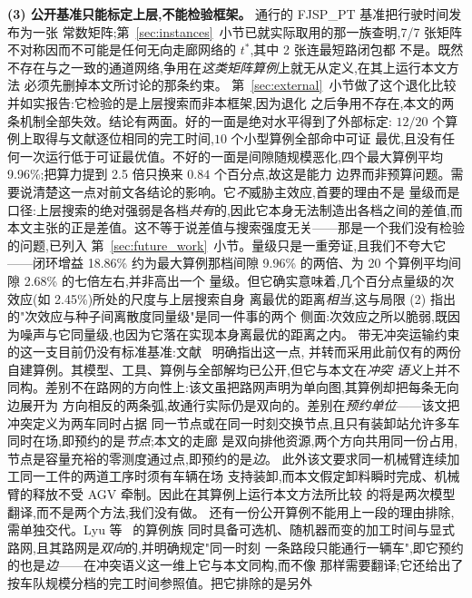 \documentclass[manuscript,screen,review]{acmart}
\newcommand{\GainLoopRule}{18.86\%}      %
\newcommand{\GainProbeLoop}{2.45\%}      %
\newcommand{\PubNInst}{20}
\newcommand{\PubNMatch}{12}               %
\newcommand{\PubGapMean}{2.68\%}          %
\newcommand{\PubGapBig}{9.96\%}           %
\newcommand{\PubBudgetRatio}{2.5}
\newcommand{\PubBudgetGainPP}{0.84}       %
\newcommand{\PubNLayout}{7}
\newcommand{\PubNLayoutAsym}{7}           %
\newcommand{\PubNLayoutBad}{2}            %
\begin{document}
\textbf{(3) 公开基准只能标定上层,不能检验框架。} 通行的 FJSP\_PT 基准把行驶时间发布为一张
常数矩阵;第~\ref{sec:instances}~小节已就实际取用的那一族查明,\PubNLayoutAsym{}/\PubNLayout{}
张矩阵不对称因而不可能是任何无向走廊网络的 $t^{*}$,其中 \PubNLayoutBad{} 张连最短路闭包都
不是。既然不存在与之一致的通道网络,争用在\emph{这类矩阵算例}上就无从定义,在其上运行本文方法
必须先删掉本文所讨论的那条约束。
第~\ref{sec:external}~小节做了这个退化比较并如实报告:它检验的是上层搜索而非本框架,因为退化
之后争用不存在,本文的两条机制全部失效。结论有两面。好的一面是绝对水平得到了外部标定:
$\PubNMatch{}/\PubNInst{}$ 个算例上取得与文献逐位相同的完工时间,$10$ 个小型算例全部命中可证
最优,且没有任何一次运行低于可证最优值。不好的一面是间隙随规模恶化,四个最大算例平均
\PubGapBig{};把算力提到 \PubBudgetRatio{} 倍只换来 $\PubBudgetGainPP$ 个百分点,故这是能力
边界而非预算问题。需要说清楚这一点对前文各结论的影响。它\emph{不}威胁主效应,首要的理由不是
量级而是口径:上层搜索的绝对强弱是各档\emph{共有}的,因此它本身无法制造出各档之间的差值,而
本文主张的正是差值。这不等于说差值与搜索强度无关——那是一个我们没有检验的问题,已列入
第~\ref{sec:future_work}~小节。量级只是一重旁证,且我们不夸大它——闭环增益 \GainLoopRule{}
约为最大算例那档间隙
\PubGapBig{} 的两倍、为 \PubNInst{} 个算例平均间隙 \PubGapMean{} 的七倍左右,并非高出一个
量级。但它确实意味着,几个百分点量级的次效应(如 \GainProbeLoop{})所处的尺度与上层搜索自身
离最优的距离\emph{相当},这与局限 (2) 指出的"次效应与种子间离散度同量级"是同一件事的两个
侧面:次效应之所以脆弱,既因为噪声与它同量级,也因为它落在实现本身离最优的距离之内。
带无冲突运输约束的这一支目前仍没有标准基准:文献~\cite{vanos2026exact} 明确指出这一点,
并转而采用此前仅有的两份自建算例。其模型、工具、算例与全部解均已公开,但它与本文在\emph{冲突
语义}上并不同构。差别不在路网的方向性上:该文虽把路网声明为单向图,其算例却把每条无向边展开为
方向相反的两条弧,故通行实际仍是双向的。差别在\emph{预约单位}——该文把冲突定义为两车同时占据
同一节点或在同一时刻交换节点,且只有装卸站允许多车同时在场,即预约的是\emph{节点};本文的走廊
是双向排他资源,两个方向共用同一份占用,节点是容量充裕的零测度通过点,即预约的是\emph{边}。
此外该文要求同一机械臂连续加工同一工件的两道工序时须有车辆在场
支持装卸,而本文假定卸料瞬时完成、机械臂的释放不受 AGV 牵制。因此在其算例上运行本文方法所比较
的将是两次模型翻译,而不是两个方法,我们没有做。
还有一份公开算例不能用上一段的理由排除,需单独交代。Lyu 等~\cite{lyu2019approach} 的算例族
同时具备可选机、随机器而变的加工时间与显式路网,且其路网是\emph{双向}的,并明确规定"同一时刻
一条路段只能通行一辆车",即它预约的也是\emph{边}——在冲突语义这一维上它与本文同构,而不像
\cite{vanos2026exact} 那样需要翻译;它还给出了按车队规模分档的完工时间参照值。把它排除的是另外
\end{document}

